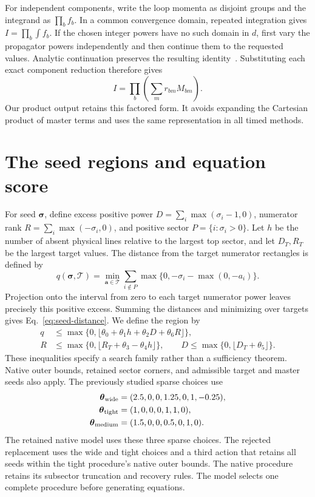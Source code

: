 For independent components, write the loop momenta as disjoint groups and the integrand as $\prod_b f_b$. In a common convergence domain, repeated integration gives $I=\prod_b\int f_b$. If the chosen integer powers have no such domain in $d$, first vary the propagator powers independently and then continue them to the requested values. Analytic continuation preserves the resulting identity~\cite{Weinzierl2022}. Substituting each exact component reduction therefore gives
\begin{equation}
 I=\prod_b\left(\sum_m r_{bm}M_{bm}\right).
 \label{eq:product-reduction}
\end{equation}
Our product output retains this factored form. It avoids expanding the Cartesian product of master terms and uses the same representation in all timed methods.

\section{The seed regions and equation score}
\label{app:sparse}
For seed $\boldsymbol\sigma$, define excess positive power $D=\sum_i\max(\sigma_i-1,0)$, numerator rank $R=\sum_i\max(-\sigma_i,0)$, and positive sector $P=\{i:\sigma_i>0\}$. Let $h$ be the number of absent physical lines relative to the largest top sector, and let $D_T,R_T$ be the largest target values. The distance from the target numerator rectangles is defined by
\begin{equation}
 q(\boldsymbol\sigma,\mathcal T)=\min_{\boldsymbol a\in\mathcal T}
 \sum_{i\notin P}\max\{0,-\sigma_i-\max(0,-a_i)\}.
 \label{eq:seed-distance}
\end{equation}
Projection onto the interval from zero to each target numerator power leaves precisely this positive excess. Summing the distances and minimizing over targets gives Eq.~\eqref{eq:seed-distance}. We define the region by
\begin{align}
 q&\leq\max\{0,\lfloor\theta_0+\theta_1h+\theta_2D+\theta_6R\rfloor\},\nonumber\\
 R&\leq\max\{0,\lfloor R_T+\theta_3-\theta_4h\rfloor\},\qquad
 D\leq\max\{0,\lfloor D_T+\theta_5\rfloor\}.
 \label{eq:seed-regions}
\end{align}
These inequalities specify a search family rather than a sufficiency theorem. Native outer bounds, retained sector corners, and admissible target and master seeds also apply. The previously studied sparse choices use
\begin{align}
 \boldsymbol\theta_{\rm wide}&=(2.5,0,0,1.25,0,1,-0.25),\nonumber\\
 \boldsymbol\theta_{\rm tight}&=(1,0,0,0,1,1,0),\nonumber\\
 \boldsymbol\theta_{\rm medium}&=(1.5,0,0,0.5,0,1,0).
 \label{eq:seed-values}
\end{align}
The retained native model uses these three sparse choices. The rejected replacement uses the wide and tight choices and a third action that retains all seeds within the tight procedure's native outer bounds. The native procedure retains its subsector truncation and recovery rules. The model selects one complete procedure before generating equations.

